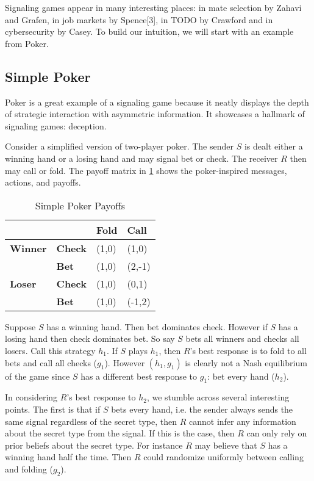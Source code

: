 \documentclass{article}
\begin{document}
Signaling games appear in many interesting places: in mate selection by Zahavi\cite{zahavi1} and Grafen\cite{grafen1}, in job markets by Spence[3], in TODO by Crawford\cite{crawford1} and in cybersecurity by Casey\cite{casey1}\cite{casey2}\cite{casey3}. To build our intuition, we will start with an example from Poker.

\subsection{Simple Poker}

Poker is a great example of a signaling game because it neatly displays the depth of strategic interaction with asymmetric information. It showcases a hallmark of signaling games: deception.

Consider a simplified version of two-player poker. The sender $S$ is dealt either a winning hand or a losing hand and may signal bet or check. The receiver $R$ then may call or fold. The payoff matrix in \ref{simplepokerpayoffs} shows the poker-inspired messages, actions, and payoffs.

\begin{table}[H]
	\centering
	\caption{Simple Poker Payoffs}
	\label{simplepokerpayoffs}
	\begin{tabular}{ll|l|l|}
		\cline{3-4}
		&       & \textbf{Fold} & \textbf{Call} \\ \hline
		\multicolumn{1}{|l|}{\textbf{Winner}} & \textbf{Check} & (1,0)  & (1,0)  \\ \cline{2-4}
		\multicolumn{1}{|l|}{}        & \textbf{Bet}   & (1,0)  & (2,-1)  \\ \hline
		\multicolumn{1}{|l|}{\textbf{Loser}}  & \textbf{Check} & (1,0)  & (0,1)  \\ \cline{2-4}
		\multicolumn{1}{|l|}{}        & \textbf{Bet}   & (1,0)  & (-1,2) \\ \hline
	\end{tabular}
\end{table}

Suppose $S$ has a winning hand. Then bet dominates check. However if $S$ has a losing hand then check dominates bet. So say $S$ bets all winners and checks all losers. Call this strategy $h_1$. If $S$ plays $h_1$, then $R$'s best response is to fold to all bets and call all checks ($g_1$). However $(h_1, g_1)$ is clearly not a Nash equilibrium of the game since $S$ has a different best response to $g_1$: bet every hand ($h_2$).

In considering $R$'s best response to $h_2$, we stumble across several interesting points. The first is that if $S$ bets every hand, i.e. the sender always sends the same signal regardless of the secret type, then $R$ cannot infer any information about the secret type from the signal. If this is the case, then $R$ can only rely on prior beliefs about the secret type. For instance $R$ may believe that $S$ has a winning hand half the time. Then $R$ could randomize uniformly between calling and folding ($g_2$).
\end{document}
